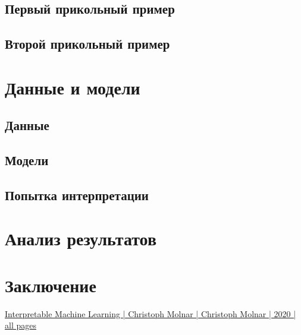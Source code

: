\documentclass[a4paper, 12pt]{article}
\begin{document}
	\subsection{Первый прикольный пример}
	
	\subsection{Второй прикольный пример}
	
	\newpage

	\section{Данные и модели}
	
	\subsection{Данные}
	
	\subsection{Модели}
	
	\subsection{Попытка интерпретации}
	
	\newpage
	
	\section{Анализ результатов}
	
	\newpage
	
	\section{Заключение}
	
	\newpage
	
	\begin{thebibliography}{99}
		\href{https://christophm.github.io/interpretable-ml-book/}{Interpretable Machine Learning | Christoph Molnar | Christoph Molnar | 2020 | all pages}
	\end{thebibliography}
\end{document}
